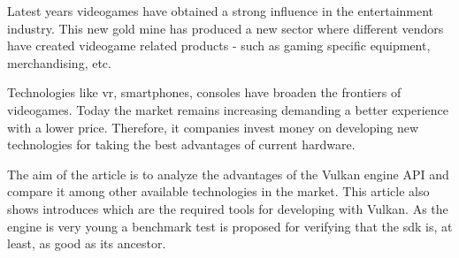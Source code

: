 Latest years videogames have obtained a strong influence in the entertainment industry. This new
gold mine has produced a new sector where different vendors have created videogame related
products - such as gaming specific equipment, merchandising, etc.

Technologies like \gls{vr}, smartphones, consoles have broaden the frontiers of videogames. Today the
market remains increasing demanding a better experience with a lower price. Therefore, \gls{it} companies
invest money on developing new technologies for taking the best advantages of current hardware.

The aim of the article is to analyze the advantages of the Vulkan engine API and compare it among other
available technologies in the market. This article also shows introduces which are the required tools for
developing with Vulkan. As the engine is very young a benchmark test is proposed for verifying that the \gls{sdk}
is, at least, as good as its ancestor.
